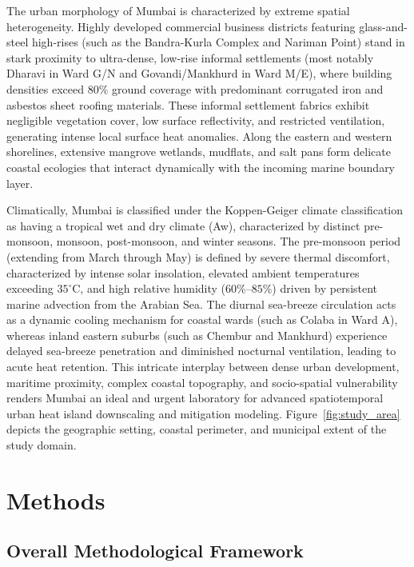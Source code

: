 \documentclass[a4paper,fleqn]{cas-sc}
\begin{document}
The urban morphology of Mumbai is characterized by extreme spatial heterogeneity. Highly developed commercial business districts featuring glass-and-steel high-rises (such as the Bandra-Kurla Complex and Nariman Point) stand in stark proximity to ultra-dense, low-rise informal settlements (most notably Dharavi in Ward G/N and Govandi/Mankhurd in Ward M/E), where building densities exceed 80\% ground coverage with predominant corrugated iron and asbestos sheet roofing materials. These informal settlement fabrics exhibit negligible vegetation cover, low surface reflectivity, and restricted ventilation, generating intense local surface heat anomalies. Along the eastern and western shorelines, extensive mangrove wetlands, mudflats, and salt pans form delicate coastal ecologies that interact dynamically with the incoming marine boundary layer.

Climatically, Mumbai is classified under the Koppen-Geiger climate classification as having a tropical wet and dry climate (Aw), characterized by distinct pre-monsoon, monsoon, post-monsoon, and winter seasons. The pre-monsoon period (extending from March through May) is defined by severe thermal discomfort, characterized by intense solar insolation, elevated ambient temperatures exceeding $35^\circ\text{C}$, and high relative humidity ($60\%\text{--}85\%$) driven by persistent marine advection from the Arabian Sea. The diurnal sea-breeze circulation acts as a dynamic cooling mechanism for coastal wards (such as Colaba in Ward A), whereas inland eastern suburbs (such as Chembur and Mankhurd) experience delayed sea-breeze penetration and diminished nocturnal ventilation, leading to acute heat retention. This intricate interplay between dense urban development, maritime proximity, complex coastal topography, and socio-spatial vulnerability renders Mumbai an ideal and urgent laboratory for advanced spatiotemporal urban heat island downscaling and mitigation modeling. Figure~\ref{fig:study_area} depicts the geographic setting, coastal perimeter, and municipal extent of the study domain.

\section{Methods}
\label{sec:methods}

\subsection{Overall Methodological Framework}
\label{subsec:framework}
\end{document}
